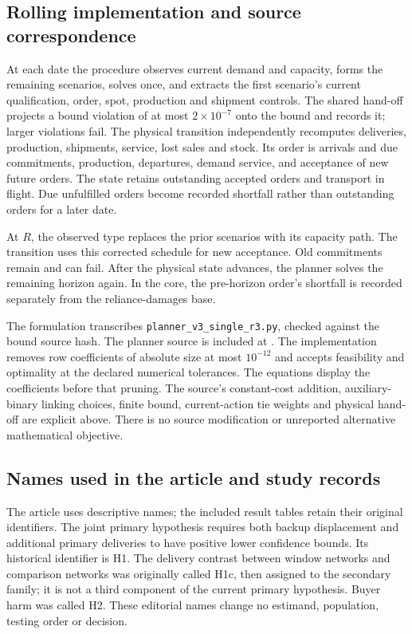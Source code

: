 \documentclass[preprint,11pt,authoryear]{elsarticle}
\begin{document}
\subsection{Rolling implementation and source correspondence}
At each date the procedure observes current demand and capacity, forms the remaining scenarios, solves once, and extracts the first scenario's current qualification, order, spot, production and shipment controls. The shared hand-off projects a bound violation of at most $2\times10^{-7}$ onto the bound and records it; larger violations fail. The physical transition independently recomputes deliveries, production, shipments, service, lost sales and stock. Its order is arrivals and due commitments, production, departures, demand service, and acceptance of new future orders. The state retains outstanding accepted orders and transport in flight. Due unfulfilled orders become recorded shortfall rather than outstanding orders for a later date.

At $R$, the observed type replaces the prior scenarios with its capacity path. The transition uses this corrected schedule for new acceptance. Old commitments remain and can fail. After the physical state advances, the planner solves the remaining horizon again. In the core, the pre-horizon order's shortfall is recorded separately from the reliance-damages base.

The formulation transcribes \texttt{planner\_v3\_single\_r3.py}, checked against the bound source hash. The planner source is included at . The implementation removes row coefficients of absolute size at most $10^{-12}$ and accepts feasibility and optimality at the declared numerical tolerances. The equations display the coefficients before that pruning. The source's constant-cost addition, auxiliary-binary linking choices, finite bound, current-action tie weights and physical hand-off are explicit above. There is no source modification or unreported alternative mathematical objective.


\subsection{Names used in the article and study records}
The article uses descriptive names; the included result tables retain their original identifiers. The joint primary hypothesis requires both backup displacement and additional primary deliveries to have positive lower confidence bounds. Its historical identifier is H1. The delivery contrast between window networks and comparison networks was originally called H1c, then assigned to the secondary family; it is not a third component of the current primary hypothesis. Buyer harm was called H2. These editorial names change no estimand, population, testing order or decision.
\end{document}
